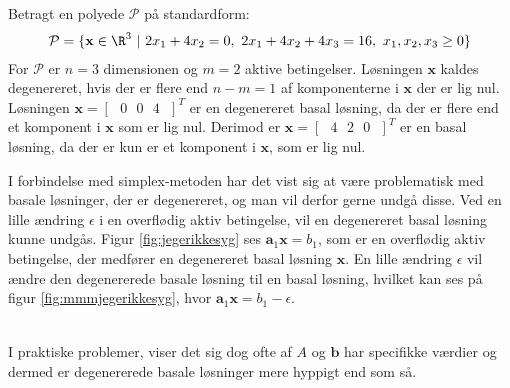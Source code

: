 \begin{eks}{}{}
%
%
Betragt en polyede $\mathcal{P}$ på standardform: 
%
\begin{align*}
\mathcal{P} = \{ 
\mathbf{x} \in \R^3 \text{  } | 
\text{  } 2 x_1 + 4 x_2 = 0, 
\text{  } 2 x_1 + 4 x_2 + 4 x_3 = 16, 
\text{  } x_1 , x_2, x_3 \geq 0 \}
\end{align*}
%
For $\mathcal{P}$ er $n=3$ dimensionen og $m=2$ aktive betingelser. 
Løsningen $\mathbf{x}$ kaldes degenereret, hvis der er flere end $n-m=1$ af komponenterne i $\mathbf{x}$ der er lig nul.
Løsningen $\mathbf{x}= [ \text{ } 0 \text{  } 0 \text{  } 4 \text{ } ]^T $ er en degenereret basal løsning, da der er flere end et komponent i $\mathbf{x}$ som er lig nul. 
Derimod er  $\mathbf{x}= [ \text{ } 4 \text{  } 2 \text{  } 0 \text{ } ]^T $ er en basal løsning, da der er kun er et komponent i $\mathbf{x}$, som er lig nul. 
%
\end{eks}
% 
%
%
I forbindelse med simplex-metoden har det vist sig at være problematisk med basale løsninger, der er degenereret, og man vil derfor gerne undgå disse.
Ved en lille ændring $\epsilon$ i en overflødig aktiv betingelse, vil en degenereret basal løsning kunne undgås. 
Figur \ref{fig:jegerikkesyg} ses $\mathbf{a}_1 \mathbf{x} = b_1$, som er en overflødig aktiv betingelse, der medfører en degenereret basal løsning $\mathbf{x}$.
En lille ændring $\epsilon$ vil ændre den degenererede basale løsning til en basal løsning, hvilket kan ses på figur \ref{fig:mmmjegerikkesyg}, hvor $\mathbf{a}_1 \mathbf{x} = b_1 - \epsilon$.
%
%
\begin{center}
$
\begin{array}{cc}
&

\end{array}
$
\end{center}
%
%
I praktiske problemer, viser det sig dog ofte af $A$ og $\mathbf{b}$ har specifikke værdier og dermed er degenererede basale løsninger mere hyppigt end som så.
%